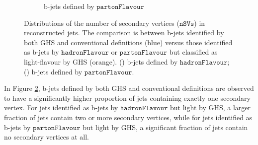 \documentclass[10pt,twocolumn]{article}
\newcommand*{\parFlav}{\texttt{partonFlavour}}
\newcommand*{\hadFlav}{\texttt{hadronFlavour}}
\begin{document}
\begin{figure}[!htbp]
\begin{subfigure}[t]{0.48\textwidth}
        \caption{b-jets defined by $\parFlav$}
        \label{fig:jet_nSVs_full_b_parton_b}
    \end{subfigure}
    \caption{Distributions of the number of secondary vertices ($\texttt{nSVs}$) in reconstructed jets. The comparison is between b-jets identified by both GHS and conventional definitions (blue) versus those identified as b-jets by $\hadFlav$ or $\parFlav$ but classified as light-flavour by GHS (orange). () b-jets defined by $\hadFlav$; () b-jets defined by $\parFlav$.}
    \label{fig:jet_nSVs_full_b}
\end{figure}

In Figure \ref{fig:jet_nSVs_full_b}, b-jets defined by both GHS and conventional definitions are observed to have a significantly higher proportion of jets containing exactly one secondary vertex. For jets identified as b-jets by $\hadFlav$ but light by GHS, a larger fraction of jets contain two or more secondary vertices, while for jets identified as b-jets by $\parFlav$ but light by GHS, a significant fraction of jets contain no secondary vertices at all. 
\end{document}
